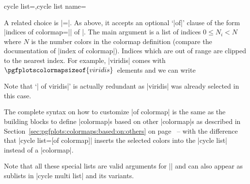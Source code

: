 \begin{pgfplotskeylist}{cycle list=,cycle list name=}
{    A related choice is |=|. As
    above, it accepts an optional `|of|' clause of the form
    |indices of colormap=|| of |. The main
    argument is a list of indices $0\le N_i < N$ where $N$ is the number colors
    in the colormap definition (compare the documentation of
    |index of colormap|). Indices which are out of range are clipped to the
    nearest index. For example, |viridis| comes with
    $\pgfplotscolormapsizeof{viridis}$~elements and we can write
\begin{codeexample}[]
\end{codeexample}
    Note that `| of viridis|' is actually redundant as |viridis| was already
    selected in this case.

    The complete syntax on how to customize |of colormap| is the same
    as the building blocks to define |colormap|s based on other
    |colormap|s as described in
    Section~\ref{sec:pgfplots:colormaps:based:on:others} on
    page~\pageref{sec:pgfplots:colormaps:based:on:others} -- with the
    difference that |cycle list={[of colormap]}| inserts the selected colors
    into the |cycle list| instead of a |colormap|.

    Note that all these special lists are valid arguments for
    |\pgfplotscreateplotcyclelist| and can also appear as sublists in
    |cycle multi list| and its variants.

}
\end{pgfplotskeylist}
